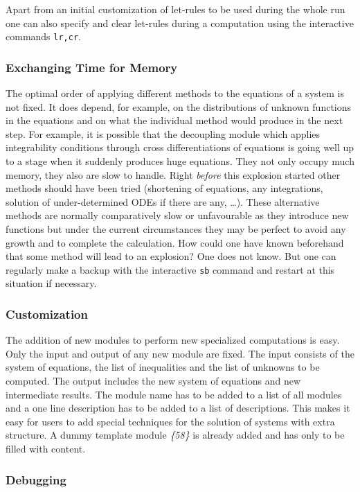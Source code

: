 Apart from an initial customization of let-rules to be used during the
whole run one can also specify and clear let-rules during a
computation using the interactive commands \texttt{lr,cr}.

\subsubsection{Exchanging Time for Memory}

The optimal order of applying different methods to the equations of a
system is not fixed.  It does depend, for example, on the
distributions of unknown functions in the equations and on what the
individual method would produce in the next step.  For example, it is
possible that the decoupling module which applies integrability
conditions through cross differentiations of equations is going well
up to a stage when it suddenly produces huge equations.  They not only
occupy much memory, they also are slow to handle.  Right \emph{before}
this explosion started other methods should have been tried
(shortening of equations, any integrations, solution of
under-determined ODEs if there are any, \ldots).  These alternative
methods are normally comparatively slow or unfavourable as they
introduce new functions but under the current circumstances they may
be perfect to avoid any growth and to complete the calculation.  How
could one have known beforehand that some method will lead to an
explosion?  One does not know.  But one can regularly make a backup
with the interactive \texttt{sb} command and restart at this situation
if necessary.

\subsubsection{Customization}

The addition of new modules to perform new specialized computations is
easy.  Only the input and output of any new module are fixed.  The
input consists of the system of equations, the list of inequalities
and the list of unknowns to be computed.  The output includes the new
system of equations and new intermediate results.  The module name has
to be added to a list of all modules and a one line description has to
be added to a list of descriptions.  This makes it easy for users to
add special techniques for the solution of systems with extra
structure.  A dummy template module \emph{\{58\}} is already added and
has only to be filled with content.

\subsubsection{Debugging}

